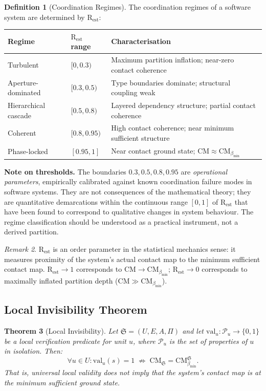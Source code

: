 \documentclass[12pt,a4paper,twocolumn]{article}
\theoremstyle{plain}
\newtheorem{theorem}{Theorem}[section]
\theoremstyle{definition}
\newtheorem{definition}[theorem]{Definition}
\theoremstyle{remark}
\newtheorem{remark}[theorem]{Remark}
\newcommand{\CM}{\mathrm{CM}}
\newcommand{\bmin}{\beta_{\min}}
\newcommand{\Rest}{\mathrm{R}_{\mathrm{est}}}
\newcommand{\CMbmin}{\CM_{\bmin}}
\newcommand{\val}{\mathrm{val}}
\begin{document}
\begin{definition}[Coordination Regimes]
\label{def:coordination-regimes}
The coordination regimes of a software system are determined by $\Rest$:

\begin{center}
\begin{tabular}{lll}
  \toprule
  Regime & $\Rest$ range & Characterisation \\
  \midrule
  Turbulent & $[0, 0.3)$
    & Maximum partition inflation; near-zero contact coherence \\
  Aperture-dominated & $[0.3, 0.5)$
    & Type boundaries dominate; structural coupling weak \\
  Hierarchical cascade & $[0.5, 0.8)$
    & Layered dependency structure; partial contact coherence \\
  Coherent & $[0.8, 0.95)$
    & High contact coherence; near minimum sufficient structure \\
  Phase-locked & $[0.95, 1]$
    & Near contact ground state; $\CM \approx \CMbmin$ \\
  \bottomrule
\end{tabular}
\end{center}

\textbf{Note on thresholds.}  The boundaries $0.3, 0.5, 0.8, 0.95$ are
\emph{operational parameters}, empirically calibrated against known
coordination failure modes in software systems.  They are not consequences
of the mathematical theory; they are quantitative demarcations within the
continuous range $[0,1]$ of $\Rest$ that have been found to correspond to
qualitative changes in system behaviour.  The regime classification should
be understood as a practical instrument, not a derived partition.
\end{definition}

\begin{remark}
$\Rest$ is an order parameter in the statistical mechanics sense: it measures
proximity of the system's actual contact map to the minimum sufficient contact
map.  $\Rest \to 1$ corresponds to $\CM \to \CMbmin$; $\Rest \to 0$
corresponds to maximally inflated partition depth ($\CM \gg \CMbmin$).
\end{remark}

\subsection{Local Invisibility Theorem}

\begin{theorem}[Local Invisibility]
\label{thm:local-invisibility}
Let $\mathfrak{S} = (U, E, A, \Pi)$ and let $\val_u : \mathcal{P}_u \to
\{0,1\}$ be a local verification predicate for unit $u$, where $\mathcal{P}_u$
is the set of properties of $u$ in isolation.  Then:
\begin{equation}
  \forall u \in U : \val_u(s) = 1 \;\not\Rightarrow\;
    \CM_\mathfrak{S} = \CMbmin^\mathfrak{S}.
\end{equation}
That is, universal local validity does not imply that the system's contact
map is at the minimum sufficient ground state.
\end{theorem}
\end{document}
